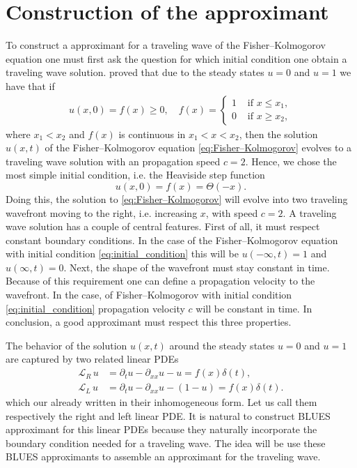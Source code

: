 \documentclass[amsmath,amssymb,amsfonts,aps,pre,preprint,superscriptaddress,bibnotes,showpacs,showkeys,longbibliography]{revtex4-1}
\begin{document}
\section{Construction of the approximant} \label{sec:constructing_approximant}
To construct a approximant for a traveling wave of the Fisher–Kolmogorov equation one must first ask the question for which initial condition one obtain a traveling wave solution. \citet{kolmogorov1937study} proved that due to the steady states $u=0$ and $u=1$ we have that if
\begin{align}\label{eq:kolmogorov criteria}
	u(x, 0)=f(x) \geq 0, \quad f(x)= \begin{cases}1 & \text { if } x \leq x_{1}, \\ 0 & \text { if } x \geq x_{2},\end{cases}
\end{align}
where $x_{1}<x_{2}$ and $f(x)$ is continuous in $x_{1}<x<x_{2}$, then the solution $u(x, t)$ of the Fisher–Kolmogorov equation \eqref{eq:Fisher–Kolmogorov} evolves to a traveling wave solution with an propagation speed $c=2$. Hence, we chose the most simple initial condition, i.e. the Heaviside step function 
\begin{equation}
    \label{eq:initial_condition}
    u(x,0)=f(x)=\Theta(-x).
\end{equation}
Doing this, the solution to \eqref{eq:Fisher–Kolmogorov} will evolve into two traveling wavefront moving to the right, i.e. increasing $x$, with speed $c = 2$. A traveling wave solution has a couple of central features. First of all, it must respect constant boundary conditions. In the case of the Fisher–Kolmogorov equation with initial condition \eqref{eq:initial_condition} this will be $u(-\infty, t)=1$ and $u(\infty, t)=0$. Next, the shape of the wavefront must stay constant in time. Because of this requirement one can define a propagation velocity to the wavefront. In the case, of Fisher–Kolmogorov with initial condition \eqref{eq:initial_condition} propagation velocity $c$ will be constant in time. In conclusion, a good approximant must respect this three properties.

The behavior of the solution $u(x,t)$ around the steady states $u=0$ and $u=1$ are captured by two related linear PDEs
\begin{align}
\label{eq:linear_operator_Right}
    \mathcal{L}_R \, u &= \partial_t u -\partial_{xx}u - u=f(x)\delta(t),\\
    \mathcal{L}_L \,  u &=\partial_t u -\partial_{xx}u - (1-u)=f(x)\delta(t).
    \label{eq:linear_operator_Left}
\end{align}
which our already written in their inhomogeneous form. Let us call them respectively the right and left linear PDE. It is natural to construct BLUES approximant for this linear PDEs because they naturally incorporate the boundary condition needed for a traveling wave. The idea will be use these BLUES approximants to assemble an approximant for the traveling wave.
\end{document}
